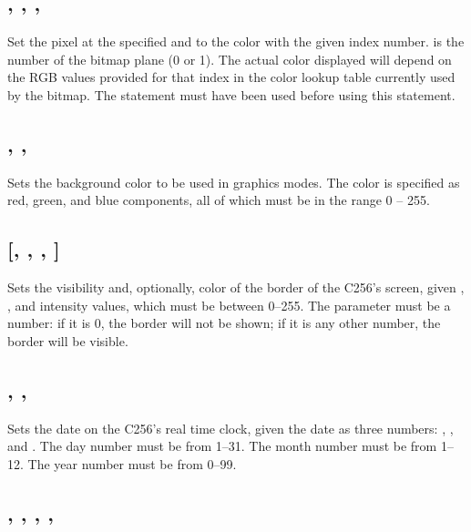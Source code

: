 \documentclass{report}
\begin{document}
    \subsection*{ , , , }

    Set the pixel at the specified  and  to the
    color with the given  index number.
     is the number of the bitmap plane (0 or 1).
    The actual color displayed will depend on the RGB values provided for
    that index in the color lookup table currently used by the bitmap.
    The  statement must have been used before using
    this statement.

    \subsection*{ , , }

    Sets the background color to be used in graphics modes.
    The color is specified as red, green, and blue components,
    all of which must be in the range 0 -- 255.

    \subsection*{  [, , ,  ]}

    Sets the visibility and, optionally, color of the border of the C256's screen, given
    , , and  intensity values, which must be
    between 0--255.
    The parameter  must be a number: if it is 0, the border
    will not be shown; if it is any other number, the border will be visible.

    \subsection*{ , , }

    Sets the date on the C256's real time clock, given the date as three numbers:
    , , and .
    The day number must be from 1--31.
    The month number must be from 1--12.
    The year number must be from 0--99.

    \subsection*{ , , , , }
\end{document}
